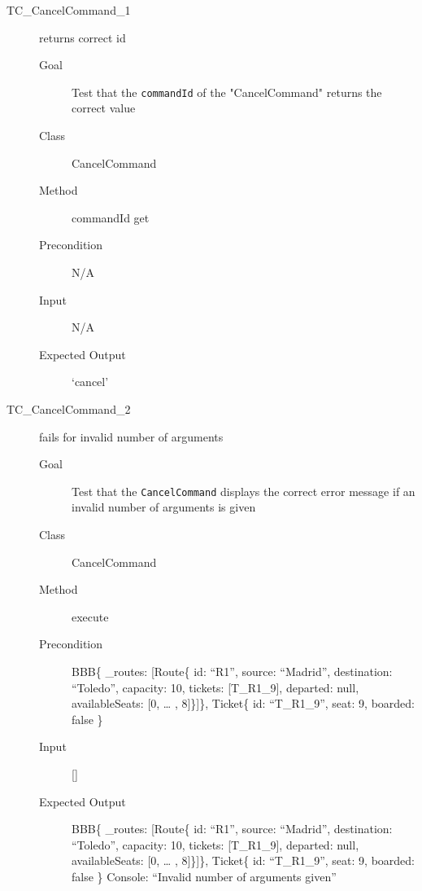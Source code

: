 \documentclass[11pt]{article}
\begin{document}
\begin{description}
\item[{TC\_CancelCommand\_1}] returns correct id
\begin{description}
\item[{Goal}] Test that the \texttt{commandId} of the "CancelCommand" returns the correct value
\item[{Class}] CancelCommand
\item[{Method}] commandId get
\item[{Precondition}] N/A
\item[{Input}] N/A
\item[{Expected Output}] ‘cancel’
\end{description}
\end{description}


\begin{description}
\item[{TC\_CancelCommand\_2}] fails for invalid number of arguments
\begin{description}
\item[{Goal}] Test that the \texttt{CancelCommand} displays the correct error message if an invalid number of arguments is given
\item[{Class}] CancelCommand
\item[{Method}] execute
\item[{Precondition}] BBB\{ \_routes: [Route\{ id: “R1”, source: “Madrid”, destination: “Toledo”, capacity: 10,  tickets: [T\_R1\_9], departed: null, availableSeats: [0, … , 8]\}]\}, Ticket\{ id: “T\_R1\_9”, seat: 9, boarded: false \}
\item[{Input}] []
\item[{Expected Output}] BBB\{ \_routes: [Route\{ id: “R1”, source: “Madrid”, destination: “Toledo”, capacity: 10,  tickets: [T\_R1\_9], departed: null, availableSeats: [0, … , 8]\}]\}, Ticket\{ id: “T\_R1\_9”, seat: 9, boarded: false \}
Console: “Invalid number of arguments given”
\end{description}
\end{description}
\end{document}
